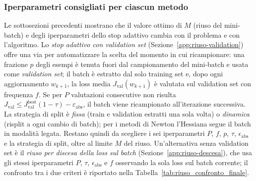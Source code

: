 \documentclass[a4paper,12pt]{article}
\numberwithin{equation}{section}
\numberwithin{figure}{section}
\numberwithin{table}{section}
\begin{document}
\subsubsection{Iperparametri consigliati per ciascun metodo}\label{app:riuso-consigliati}

Le sottosezioni precedenti mostrano che il valore ottimo di $M$ (riuso del
mini-batch) e degli iperparametri dello stop adattivo cambia con il problema e
con l'algoritmo. Lo \emph{stop adattivo con validation set}
(Sezione~\ref{app:riuso-validation}) offre una via per automatizzare la scelta
del momento in cui ricampionare: una frazione $p$ degli esempi è tenuta fuori
dal campionamento del mini-batch e usata come \emph{validation set}; il batch è
estratto dal solo training set e, dopo ogni aggiornamento $w_{k+1}$, la loss
media $J_{\mathrm{val}}(w_{k+1})$ è valutata sul validation set con frequenza
$f$. Se per $P$ valutazioni consecutive non risulta $J_{\mathrm{val}} \le
J_{\mathrm{val}}^{\mathrm{best}}(1-\tau)-\varepsilon_{\mathrm{abs}}$, il batch
viene ricampionato all'iterazione successiva. La strategia di split è
\emph{fissa} (train e validation estratti una sola volta) o \emph{dinamica}
(risplit a ogni cambio di batch); per i metodi di Newton l'Hessiana segue il
batch in modalità legata. Restano quindi da scegliere i sei iperparametri
$P$, $f$, $p$, $\tau$, $\epsilon_{\mathrm{abs}}$ e la strategia di split,
oltre al limite $M$ del riuso. Un'alternativa senza validation set è il
\emph{riuso per discesa della loss sul batch}
(Sezione~\ref{app:riuso-descesa}), che usa gli stessi iperparametri $P$,
$\tau$, $\epsilon_{\mathrm{abs}}$ e $f$ osservando la sola loss sul batch
corrente; il confronto tra i due criteri è riportato nella
Tabella~\ref{tab:riuso_confronto_finale}.
\end{document}
